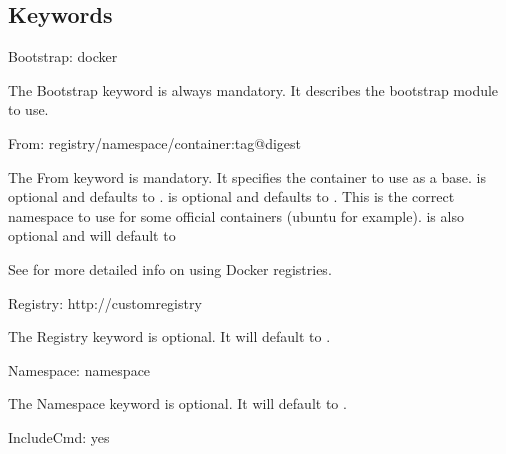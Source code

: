 \documentclass[letterpaper,10pt,english]{sphinxmanual}
\begin{document}
\subsection{Keywords}
\label{\detokenize{appendix:id2}}
%
\begin{sphinxVerbatim}[commandchars=\\\{\}]
Bootstrap: docker
\end{sphinxVerbatim}

The Bootstrap keyword is always mandatory. It describes the bootstrap module to
use.

%
\begin{sphinxVerbatim}[commandchars=\\\{\}]
From: \PYGZlt{}registry\PYGZgt{}/\PYGZlt{}namespace\PYGZgt{}/\PYGZlt{}container\PYGZgt{}:\PYGZlt{}tag\PYGZgt{}@\PYGZlt{}digest\PYGZgt{}
\end{sphinxVerbatim}

The From keyword is mandatory. It specifies the container to use as a base.
 is optional and defaults to .  is
optional and defaults to . This is the correct namespace to use for
some official containers (ubuntu for example).  is also optional and will
default to 

See  for more detailed
info on using Docker registries.

%
\begin{sphinxVerbatim}[commandchars=\\\{\}]
Registry: http://custom\PYGZus{}registry
\end{sphinxVerbatim}

The Registry keyword is optional. It will default to .

%
\begin{sphinxVerbatim}[commandchars=\\\{\}]
Namespace: namespace
\end{sphinxVerbatim}

The Namespace keyword is optional. It will default to .

%
\begin{sphinxVerbatim}[commandchars=\\\{\}]
IncludeCmd: yes
\end{sphinxVerbatim}
\end{document}
